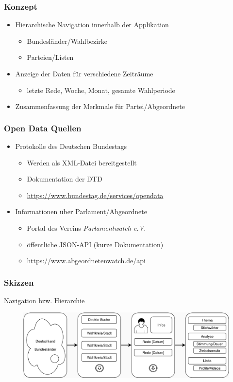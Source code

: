 \documentclass{beamer}
\begin{document}
    \begin{frame}
      \frametitle{Konzept}
      \begin{itemize}
        \item Hierarchische Navigation innerhalb der Applikation
        \begin{itemize}
          \item Bundesländer/Wahlbezirke
          \item Parteien/Listen
        \end{itemize}
        \item Anzeige der Daten für verschiedene Zeiträume 
        \begin{itemize}
          \item letzte Rede, Woche, Monat, gesamte Wahlperiode
        \end{itemize} 
        \item Zusammenfassung der Merkmale für Partei/Abgeordnete
      \end{itemize}
    \end{frame}
    
    \begin{frame}
      \frametitle{Open Data Quellen}
      \begin{itemize}
        \item Protokolle des Deutschen Bundestags
        \begin{itemize}
          \item Werden als XML-Datei bereitgestellt
          \item Dokumentation der DTD
          \item \url{https://www.bundestag.de/services/opendata}
        \end{itemize}
        \item Informationen über Parlament/Abgeordnete
        \begin{itemize}
          \item Portal des Vereins \textit{Parlamentwatch e.V.}
          \item öffentliche JSON-API (kurze Dokumentation)
          \item \url{https://www.abgeordnetenwatch.de/api}
        \end{itemize}
      \end{itemize}
    \end{frame}

    \begin{frame}
      \frametitle{Skizzen}
      \centering
      Navigation bzw. Hierarchie
      \vspace{1cm}
      \centering
      \begin{figure}[h!]
        \centering\includegraphics[width=\textwidth]{fig/mockup1.pdf}
      \end{figure}
    \end{frame}
\end{document}
